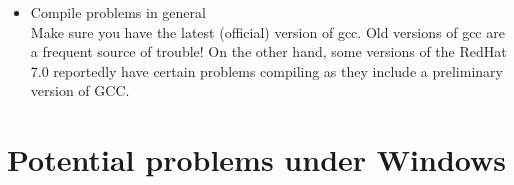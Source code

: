 \begin{itemize}
\item{Compile problems in general}\\
  Make sure you have the latest (official) version of gcc. Old versions of
  gcc are a frequent source of trouble! On the other hand, some versions
  of the RedHat 7.0 reportedly have certain problems compiling \FlightGear{} as they include
  a preliminary version of GCC.
 \end{itemize}

\section{Potential problems under Windows}
